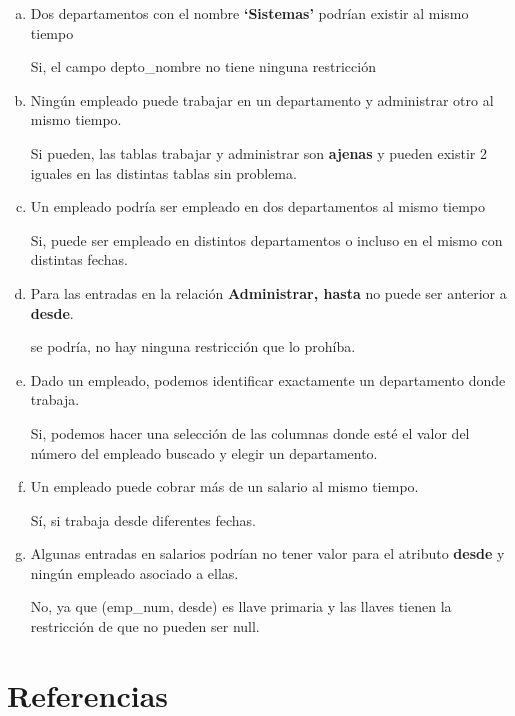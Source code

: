 \documentclass{article}
\begin{document}
\begin{enumerate}[a)]
    \item Dos departamentos con el nombre \textbf{‘Sistemas’} podrían existir al mismo tiempo\par
    Si, el campo depto\_nombre no tiene ninguna restricción
    
    \item Ningún empleado puede trabajar en un departamento y administrar otro al mismo tiempo. 
    \par Si pueden, las tablas trabajar y administrar son \textbf{ajenas} y pueden existir 2 iguales en las distintas tablas sin problema.
    
    \item Un empleado podría ser empleado en dos departamentos al mismo tiempo
    \par Si, puede ser empleado en distintos departamentos o incluso en el mismo con distintas fechas.
    \item Para las entradas en la relación \textbf{Administrar, hasta} no puede ser anterior a \textbf{desde}.
    \par se podría, no hay ninguna restricción que lo prohíba.
    
    \item Dado un empleado, podemos identificar exactamente un departamento donde trabaja.
    \par Si, podemos hacer una selección de las columnas donde esté el valor del número del empleado buscado y elegir un departamento. 
    
    \item Un empleado puede cobrar más de un salario al mismo tiempo.
    \par Sí, si trabaja desde diferentes fechas.
    
    \item Algunas entradas en salarios podrían no tener valor para el atributo \textbf{desde} y ningún empleado asociado a ellas.
    \par No, ya que (emp\_num, desde) es llave primaria y las llaves tienen la restricción de que no pueden ser null.
    
\end{enumerate} 
    

\section*{Referencias}

 
\end{document}
